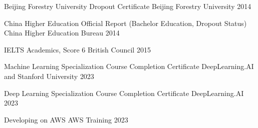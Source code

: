 

\begin{cvhonors}

  \cvhonor
    {Beijing Forestry University Dropout Certificate} %
    {Beijing Forestry University} %
    {} %
    {2014} %

  \cvhonor
    {China Higher Education Official Report (Bachelor Education, Dropout Status)} %
    {China Higher Education Bureau} %
    {} %
    {2014} %

  \cvhonor
    {IELTS Academics, Score 6} %
    {British Council} %
    {} %
    {2015} %

  \cvhonor
    {Machine Learning Specialization Course Completion Certificate} %
    {DeepLearning.AI and Stanford University} %
    {} %
    {2023} %

  \cvhonor
    {Deep Learning Specialization Course Completion Certificate} %
    {DeepLearning.AI} %
    {} %
    {2023} %

  \cvhonor
    {Developing on AWS} %
    {AWS Training} %
    {} %
    {2023} %

\end{cvhonors}
